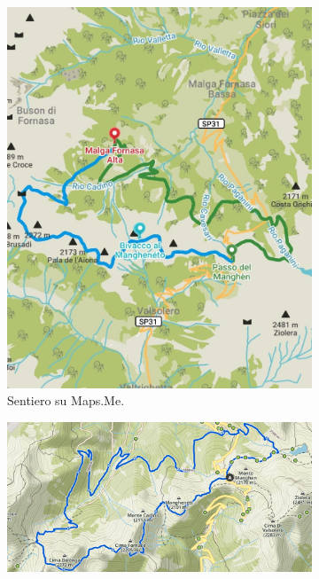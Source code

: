 \documentclass{article}
\begin{document}
\begin{figure}[htbp!]
    \centering
    \begin{subfigure}[t]{0.45\textwidth}
        \centering
        \vspace{0pt} %
        \includegraphics[width=\textwidth]{images/sentiero_mapsMe_Giro2.jpg}
        \caption{Sentiero su Maps.Me.}
        \label{fig:foto_lunga2}
    \end{subfigure}
    \hfill
    \begin{subfigure}[t]{0.45\textwidth}
        \centering
        \vspace{0pt} %
        \includegraphics[width=\textwidth]{images/sentiero_komoot_Giro2.png}

\end{subfigure}
\end{figure}
\end{document}
